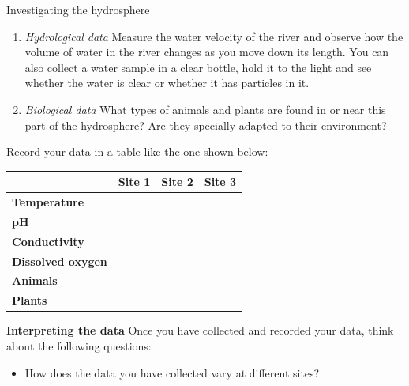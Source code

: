 \begin{Investigation}{Investigating the hydrosphere
      }
\begin{enumerate}[noitemsep, label=\textbf{\arabic*}. ]
\label{m38138*uid7}\item \textsl{Hydrological data}
Measure the water velocity of the river and observe how the volume of water in the river changes as you move down its length. You can also collect a water sample in a clear bottle, hold it to the light and see whether the water is clear or whether it has particles in it.
\label{m38138*uid8}\item \textsl{Biological data}
What types of animals and plants are found in or near this part of the hydrosphere? Are they specially adapted to their environment?
\end{enumerate}

Record your data in a table like the one shown below:
          \begin{table}[H]
        \begin{center}
      \label{m38138*id334712}
    \noindent
      \begin{tabular}{|l|l|l|l|}\hline
         &
        \textbf{Site 1} &
        \textbf{Site 2} &
        \textbf{Site 3} \\ \hline
        \textbf{Temperature} &
         &
         &
       \\ \hline
        \textbf{pH} &
         &
         &
      \\ \hline
        \textbf{Conductivity} &
         &
         &
       \\ \hline
        \textbf{Dissolved oxygen} &
         &
         &
        \\ \hline
        \textbf{Animals} &
         &
         &
        \\ \hline
        \textbf{Plants} &
         &
         &
        \\ \hline
    \end{tabular}
      \end{center}
\end{table}
    \par
  \label{m38138*uid9}\item \textbf{Interpreting the data}
Once you have collected and recorded your data, think about the following questions:
\label{m38138*id334958}\begin{itemize}[noitemsep]
            \label{m38138*uid10}\item How does the data you have collected vary at different sites?

\end{itemize}
\end{Investigation}
